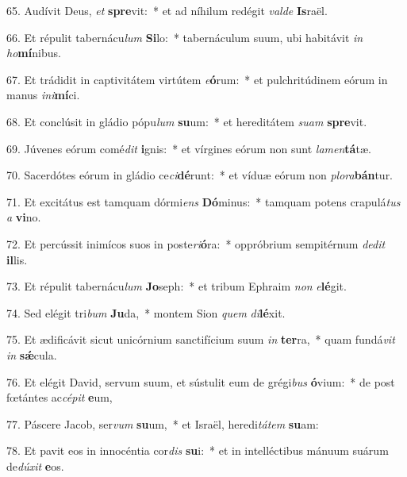 65. Audívit Deus, \textit{et} \textbf{spre}vit:~*  et ad níhilum redégit \textit{val}\textit{de} \textbf{Is}raël.\

66. Et répulit tabernácu\textit{lum} \textbf{Si}lo:~*  tabernáculum suum, ubi habitávit \textit{in} \textit{ho}\textbf{mí}nibus.\

67. Et trádidit in captivitátem virtútem \textit{e}\textbf{ó}rum:~*  et pulchritúdinem eórum in manus \textit{in}\textit{i}\textbf{mí}ci.\

68. Et conclúsit in gládio pópu\textit{lum} \textbf{su}um:~*  et hereditátem \textit{su}\textit{am} \textbf{spre}vit.\

69. Júvenes eórum comé\textit{dit} \textbf{i}gnis:~*  et vírgines eórum non sunt \textit{la}\textit{men}\textbf{tá}tæ.\

70. Sacerdótes eórum in gládio ce\textit{ci}\textbf{dé}runt:~*  et víduæ eórum non \textit{plo}\textit{ra}\textbf{bán}tur.\

71. Et excitátus est tamquam dórmi\textit{ens} \textbf{Dó}minus:~*  tamquam potens crapulá\textit{tus} \textit{a} \textbf{vi}no.\

72. Et percússit inimícos suos in poste\textit{ri}\textbf{ó}ra:~*  oppróbrium sempitérnum \textit{de}\textit{dit} \textbf{il}lis.\

73. Et répulit tabernácu\textit{lum} \textbf{Jo}seph:~*  et tribum Ephraim \textit{non} \textit{e}\textbf{lé}git.\

74. Sed elégit tri\textit{bum} \textbf{Ju}da,~*  montem Sion \textit{quem} \textit{di}\textbf{lé}xit.\

75. Et ædificávit sicut unicórnium sanctifícium suum \textit{in} \textbf{ter}ra,~*  quam fundá\textit{vit} \textit{in} \textbf{sǽ}cula.\

76. Et elégit David, servum suum, et sústulit eum de grégi\textit{bus} \textbf{ó}vium:~*  de post fœtántes ac\textit{cé}\textit{pit} \textbf{e}um,\

77. Páscere Jacob, ser\textit{vum} \textbf{su}um,~*  et Israël, heredi\textit{tá}\textit{tem} \textbf{su}am:\

78. Et pavit eos in innocéntia cor\textit{dis} \textbf{su}i:~*  et in intelléctibus mánuum suárum de\textit{dú}\textit{xit} \textbf{e}os.\

